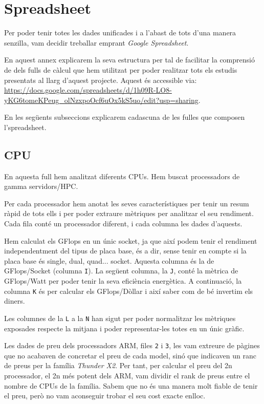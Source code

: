 \appendix
\section{Spreadsheet} \label{sec:annex}
Per poder tenir totes les dades unificades i a l'abast de tots d'una manera senzilla, vam decidir treballar emprant \textit{Google Spreadsheet}. 

En aquest annex explicarem la seva estructura per tal de facilitar la comprensió de dels fulls de càlcul que hem utilitzat per poder realitzar tots els estudis presentats al llarg d'aquest projecte. Aquest és accessible via: \url{https://docs.google.com/spreadsheets/d/1h09R-LO8-yKG6tomeKPeug\_olNzxpoOcf6uOx5kS5uo/edit?usp=sharing}.

En les següents subseccions explicarem cadascuna de les fulles que composen l'spreadsheet.

\subsection{CPU}
En aquesta full hem analitzat diferents CPUs. Hem buscat processadors de gamma servidors/HPC. 

Per cada processador hem anotat les seves característiques per tenir un resum ràpid de tots ells i per poder extraure mètriques per analitzar el seu rendiment. Cada fila conté un processador diferent, i cada columna les dades d'aquests.

Hem calculat els GFlops en un únic socket, ja que així podem tenir el rendiment independentment del tipus de placa base, és a dir, sense tenir en compte si la placa base és single, dual, quad... socket. 
Aquesta columna és la de GFlops/Socket (columna \texttt{I}). La següent columna, la \texttt{J}, conté la mètrica de GFlops/Watt per poder tenir la seva eficiència energètica. A continuació, la columna \texttt{K} és per calcular els GFlops/Dòllar i així saber com de bé invertim els diners.

Les columnes de la \texttt{L} a la \texttt{N} han sigut per poder normalitzar les mètriques exposades respecte la mitjana i poder representar-les totes en un únic gràfic.

Les dades de preu dels processadors ARM, files \texttt{2} i \texttt{3}, les vam extreure de pàgines que no acabaven de concretar el preu de cada model, sinó que indicaven un ranc de preus per la família \textit{Thunder X2}. Per tant, per calcular el preu del 2n processador, el 2n més potent dels ARM, vam dividir el rank de preus entre el nombre de CPUs de la família. Sabem que no és una manera molt fiable de tenir el preu, però no vam aconseguir trobar el seu cost exacte enlloc.

